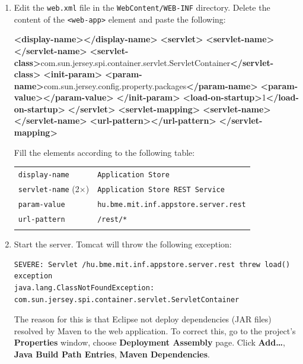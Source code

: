 \documentclass[]{report}
\newenvironment{Shaded}{}{}
\newcommand{\KeywordTok}[1]{\textcolor[rgb]{0.00,0.44,0.13}{\textbf{{#1}}}}
\newcommand{\NormalTok}[1]{{#1}}
\begin{document}
\begin{enumerate}
\def\labelenumi{\arabic{enumi}.}
\item
  Edit the \texttt{web.xml} file in the \texttt{WebContent/WEB-INF}
  directory. Delete the content of the
  \texttt{\textless{}web-app\textgreater{}} element and paste the
  following:

\begin{Shaded}
\begin{Highlighting}[]
\KeywordTok{<display-name></display-name>}
\KeywordTok{<servlet>}
  \KeywordTok{<servlet-name></servlet-name>}
  \KeywordTok{<servlet-class>}\NormalTok{com.sun.jersey.spi.container.servlet.ServletContainer}\KeywordTok{</servlet-class>}
  \KeywordTok{<init-param>}
    \KeywordTok{<param-name>}\NormalTok{com.sun.jersey.config.property.packages}\KeywordTok{</param-name>}
    \KeywordTok{<param-value></param-value>}
  \KeywordTok{</init-param>}
  \KeywordTok{<load-on-startup>}\NormalTok{1}\KeywordTok{</load-on-startup>}
\KeywordTok{</servlet>}
\KeywordTok{<servlet-mapping>}
  \KeywordTok{<servlet-name></servlet-name>}
  \KeywordTok{<url-pattern></url-pattern>}
\KeywordTok{</servlet-mapping>}
\end{Highlighting}
\end{Shaded}

  Fill the elements according to the following table:

  \begin{longtable}[c]{@{}ll@{}}
  \hline\noalign{\medskip}
  \texttt{display-name} & \texttt{Application Store}
  \\\noalign{\medskip}
  \texttt{servlet-name} (2×) & \texttt{Application Store REST Service}
  \\\noalign{\medskip}
  \texttt{param-value} & \texttt{hu.bme.mit.inf.appstore.server.rest}
  \\\noalign{\medskip}
  \texttt{url-pattern} & \texttt{/rest/*}
  \\\noalign{\medskip}
  \hline
  \end{longtable}
\item
  Start the server. Tomcat will throw the following exception:

\begin{verbatim}
SEVERE: Servlet /hu.bme.mit.inf.appstore.server.rest threw load() exception
java.lang.ClassNotFoundException: com.sun.jersey.spi.container.servlet.ServletContainer
\end{verbatim}

  The reason for this is that Eclipse not deploy dependencies (JAR
  files) resolved by Maven to the web application. To correct this, go
  to the project's \textbf{Properties} window, choose \textbf{Deployment
  Assembly} page. Click \textbf{Add\ldots{}}, \textbf{Java Build Path
  Entries}, \textbf{Maven Dependencies}.


\end{enumerate}
\end{document}
